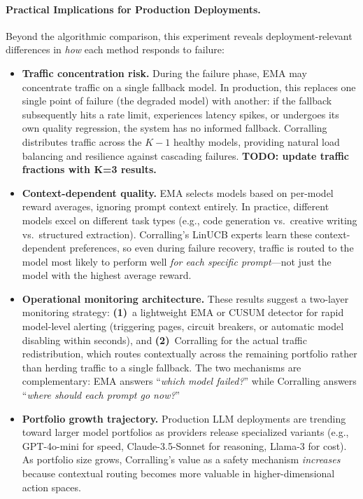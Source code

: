 \paragraph{Practical Implications for Production Deployments.}
Beyond the algorithmic comparison, this experiment reveals deployment-relevant differences in \emph{how} each method responds to failure:

\begin{itemize}[nosep]
    \item \textbf{Traffic concentration risk.} During the failure phase, EMA may concentrate traffic on a single fallback model. In production, this replaces one single point of failure (the degraded model) with another: if the fallback subsequently hits a rate limit, experiences latency spikes, or undergoes its own quality regression, the system has no informed fallback. Corralling distributes traffic across the $K{-}1$ healthy models, providing natural load balancing and resilience against cascading failures. \textbf{TODO: update traffic fractions with K=3 results.}
    \item \textbf{Context-dependent quality.} EMA selects models based on per-model reward averages, ignoring prompt context entirely. In practice, different models excel on different task types (e.g., code generation vs.\ creative writing vs.\ structured extraction). Corralling's LinUCB experts learn these context-dependent preferences, so even during failure recovery, traffic is routed to the model most likely to perform well \emph{for each specific prompt}---not just the model with the highest average reward.
    \item \textbf{Operational monitoring architecture.} These results suggest a two-layer monitoring strategy: \textbf{(1)}~a lightweight EMA or CUSUM detector for rapid model-level alerting (triggering pages, circuit breakers, or automatic model disabling within seconds), and \textbf{(2)}~Corralling for the actual traffic redistribution, which routes contextually across the remaining portfolio rather than herding traffic to a single fallback. The two mechanisms are complementary: EMA answers ``\emph{which model failed?}'' while Corralling answers ``\emph{where should each prompt go now?}''
    \item \textbf{Portfolio growth trajectory.} Production LLM deployments are trending toward larger model portfolios as providers release specialized variants (e.g., GPT-4o-mini for speed, Claude-3.5-Sonnet for reasoning, Llama-3 for cost). As portfolio size grows, Corralling's value as a safety mechanism \emph{increases} because contextual routing becomes more valuable in higher-dimensional action spaces.
\end{itemize}

